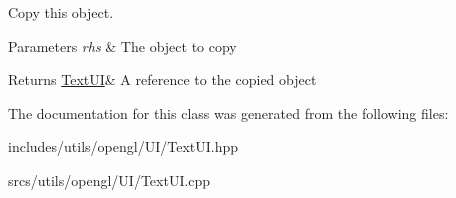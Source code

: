 Copy this object. 


\begin{DoxyParams}{Parameters}
{\em rhs} & The object to copy \\
\hline
\end{DoxyParams}
\begin{DoxyReturn}{Returns}
\hyperlink{class_text_u_i}{Text\+UI}\& A reference to the copied object 
\end{DoxyReturn}


The documentation for this class was generated from the following files\+:\begin{DoxyCompactItemize}
\item 
includes/utils/opengl/\+U\+I/Text\+U\+I.\+hpp\item 
srcs/utils/opengl/\+U\+I/Text\+U\+I.\+cpp\end{DoxyCompactItemize}
